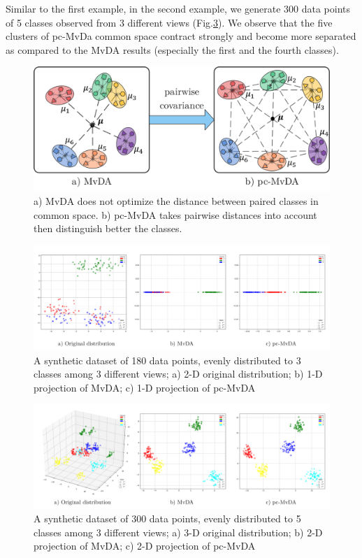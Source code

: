     Similar to the first example, in the second example, we generate 300 data points of 5 classes observed from 3 different views (Fig.\ref{fig:synthetic2}). We observe that the five clusters of pc-MvDa common space contract strongly and become more separated as compared to the MvDA results (especially the first and the fourth classes).

    \begin{figure}[htbp]
        \centering
        \includegraphics[width=0.7\linewidth]{Figs/pc-MvDA.png}
        \caption{a) MvDA does not optimize the distance between paired classes in common space. b) pc-MvDA takes pairwise distances into account then distinguish better the classes.}
        \label{fig:pc-MvDA}
    \end{figure}

    \begin{figure}[htbp]
        \centering
        \includegraphics[width=1\linewidth]{Figs/Synthetic1.png}
        \caption{A synthetic dataset of 180 data points, evenly distributed to 3 classes among 3 different views; a) 2-D original distribution; b) 1-D projection of MvDA; c) 1-D projection of pc-MvDA}
        \label{fig:synthetic1}
    \end{figure}

    \begin{figure}[htbp]
        \centering
        \includegraphics[width=1\linewidth]{Figs/Synthetic2.png}
        \caption{A synthetic dataset of 300 data points, evenly distributed to 5 classes among 3 different views; a) 3-D original distribution; b) 2-D projection of MvDA; c) 2-D projection of pc-MvDA}
        \label{fig:synthetic2}
    \end{figure}
